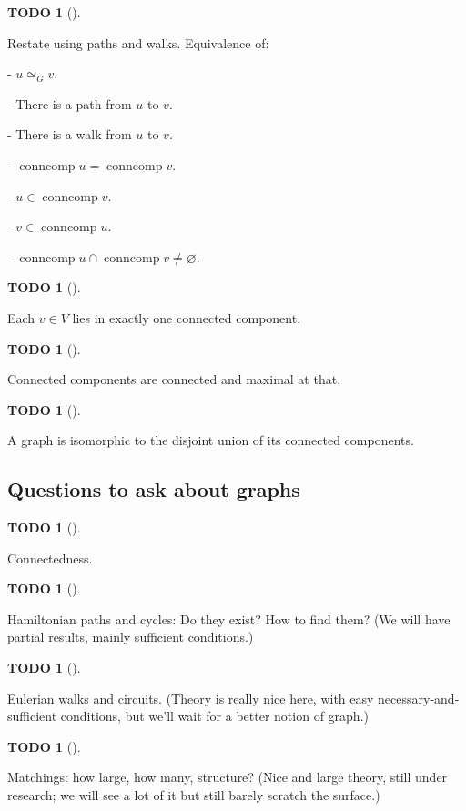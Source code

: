 \documentclass[numbers=enddot,12pt,final,onecolumn,notitlepage]{scrartcl}%
\theoremstyle{definition}
\newtheorem{quest}[theo]{TODO}
\newenvironment{todo}[1][]
{\begin{quest}[#1]\begin{leftbar}}
{\end{leftbar}\end{quest}}
\newcommand{\conncomp}{\operatorname{conncomp}}
\begin{document}
\begin{todo}
Restate using paths and walks. Equivalence of:

- $u \simeq_G v$.

- There is a path from $u$ to $v$.

- There is a walk from $u$ to $v$.

- $\conncomp u = \conncomp v$.

- $u \in \conncomp v$.

- $v \in \conncomp u$.

- $\conncomp u \cap \conncomp v \neq \varnothing$.
\end{todo}

\begin{todo}
Each $v \in V$ lies in exactly one connected component.
\end{todo}

\begin{todo}
Connected components are connected and maximal at that.
\end{todo}

\begin{todo}
A graph is isomorphic to the disjoint union of its connected
components.
\end{todo}

\subsection{\label{sect.intro.teasers}Questions to ask about graphs}

\begin{todo}
Connectedness.
\end{todo}

\begin{todo}
Hamiltonian paths and cycles:
Do they exist? How to find them? (We will have partial results, mainly sufficient conditions.)
\end{todo}

\begin{todo}
Eulerian walks and circuits.
(Theory is really nice here, with easy necessary-and-sufficient conditions, but we'll wait for a better notion of graph.)
\end{todo}

\begin{todo}
Matchings:
how large, how many, structure? (Nice and large theory, still under research; we will see a lot of it but still barely scratch the surface.)
\end{todo}
\end{document}
